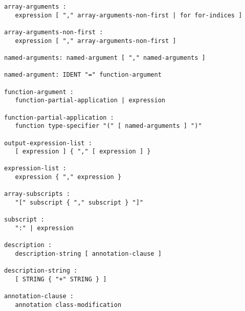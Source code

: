 \begin{lstlisting}[language=grammar]
array-arguments :
   expression [ "," array-arguments-non-first | for for-indices ]

array-arguments-non-first :
   expression [ "," array-arguments-non-first ]

named-arguments: named-argument [ "," named-arguments ]

named-argument: IDENT "=" function-argument

function-argument :
   function-partial-application | expression

function-partial-application :
   function type-specifier "(" [ named-arguments ] ")"

output-expression-list :
   [ expression ] { "," [ expression ] }

expression-list :
   expression { "," expression }

array-subscripts :
   "[" subscript { "," subscript } "]"

subscript :
   ":" | expression

description :
   description-string [ annotation-clause ]

description-string :
   [ STRING { "+" STRING } ]

annotation-clause :
   annotation class-modification
\end{lstlisting}
